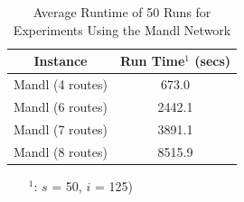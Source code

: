 \begin{table}[H]
    \centering
    \hspace*{-1.0cm}
    \begin{tabular}{|c|c|}
        \hline
        \textbf{Instance} & \textbf{Run Time$^1$ (secs)}\\
        \hline
        Mandl (4 routes) & 673.0\\
        \hline
        Mandl (6 routes) & 2442.1\\
        \hline
        Mandl (7 routes) & 3891.1\\
        \hline
        Mandl (8 routes) & 8515.9\\
        \hline
    \end{tabular}
    \caption{Average Runtime of 50 Runs for Experiments Using the Mandl Network}
    \begin{itemize}[noitemsep]
    \item[$^1$:] $s$ = 50, $i$ = 125)
    \end{itemize} 
    \label{tabel:runTimeMandl}
\end{table}


